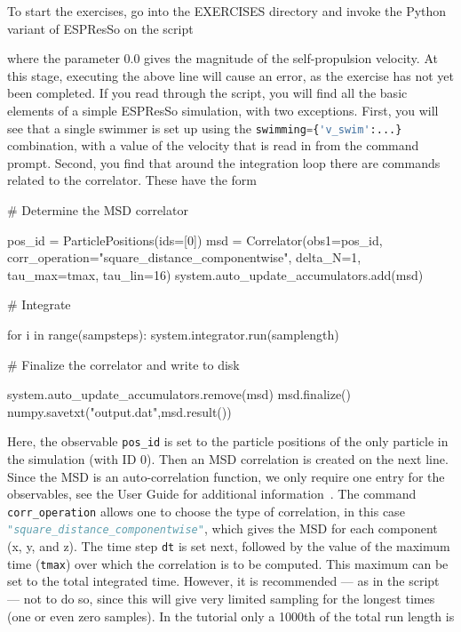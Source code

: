 \documentclass[aip,jcp,reprint,a4paper,onecolumn,amsmath]{revtex4-1}
\newcommand{\es}{\mbox{\textsf{ESPResSo}}\xspace}
\newcommand\codees{\lstinline[language=python]}
\begin{document}
To start the exercises, go into the EXERCISES directory and invoke the Python variant of \es{} on the script
where the parameter 0.0 gives the magnitude of the self-propulsion velocity. At
this stage, executing the above line will cause an error, as the exercise has
not yet been completed. If you read through the script, you will find all the
basic elements of a simple \es{} simulation, with two exceptions. First, you
will see that a single swimmer is set up using the
\codees|swimming={'v_swim':...}| combination, with a value of the velocity that
is read in from the command prompt. Second, you find that around the
integration loop there are commands related to the correlator. These have the
form
\begin{espresso}
# Determine the MSD correlator

pos_id = ParticlePositions(ids=[0])
msd = Correlator(obs1=pos_id,
                   corr_operation="square_distance_componentwise",
                   delta_N=1,
                   tau_max=tmax,
                   tau_lin=16)
system.auto_update_accumulators.add(msd)

# Integrate

for i in range(sampsteps):
    system.integrator.run(samplength)

# Finalize the correlator and write to disk

system.auto_update_accumulators.remove(msd)
msd.finalize()
numpy.savetxt("output.dat",msd.result())
\end{espresso}
Here, the observable \codees{pos_id} is set to the particle positions of the
only particle in the simulation (with ID 0). Then an MSD correlation is created
on the next line. Since the MSD is an auto-correlation function, we only
require one entry for the observables, see the User Guide for additional
information~\cite{UG}. The command \codees{corr_operation} allows one to choose
the type of correlation, in this case \codees{"square_distance_componentwise"},
which gives the MSD for each component (x, y, and z). The time step \codees{dt}
is set next, followed by the value of the maximum time (\codees{tmax}) over
which the correlation is to be computed. This maximum can be set to the total
integrated time. However, it is recommended --- as in the script --- not to do
so, since this will give very limited sampling for the longest times (one or
even zero samples). In the tutorial only a 1000th of the total run length is
\end{document}
